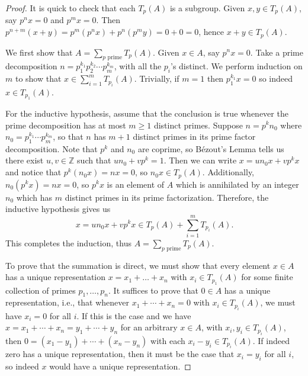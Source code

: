 \documentclass[12pt]{article}
\theoremstyle{definition}
\newcommand{\Z}{\mathbb{Z}}
\newcommand{\<}{\langle}
\renewcommand{\>}{\rangle}
\renewcommand{\_}[1]{{_{#1}}}
\begin{document}
\begin{proof}
    It is quick to check that each $T_p(A)$ is a subgroup.
    Given $x, y \in T_p(A)$, say $p^nx = 0$ and $p^mx = 0$.
    Then $p^{n+m}(x + y) = p^m(p^nx) + p^n(p^my) = 0 + 0 = 0$, hence $x + y \in T_p(A)$.

    We first show that $A = \sum_{p \text{ prime}} T_p(A)$.
    Given $x \in A$, say $p^nx = 0$.
    Take a prime decomposition $n = p_1^{k_1}p_2^{k_2} \cdots p_m^{k_m}$, with all the $p_i$'s distinct.
    We perform induction on $m$ to show that $x \in \sum_{i=1}^{m} T_{p_i}(A)$.
    Trivially, if $m = 1$ then $p_1^{k_1}x = 0$ so indeed $x \in T_{p_1}(A)$.

    For the inductive hypothesis, assume that the conclusion is true whenever the prime decomposition has at most $m \geq 1$ distinct primes.
    Suppose $n = p^kn_0$ where $n_0 = p_1^{k_1} \cdots p_m^{k_m}$, so that $n$ has $m + 1$ distinct primes in its prime factor decomposition.
    Note that $p^k$ and $n_0$ are coprime, so B\'ezout's Lemma tells us there exist $u, v \in \Z$ such that $un_0 + vp^k = 1$.
    Then we can write $x = un_0x + vp^kx$ and notice that $p^k(n_0x) = nx = 0$, so $n_0x \in T_p(A)$.
    Additionally, $n_0(p^kx) = nx = 0$, so $p^kx$ is an element of $A$ which is annihilated by an integer $n_0$ which has $m$ distinct primes in its prime factorization.
    Therefore, the inductive hypothesis gives us
    \[
        x = un_0x + vp^kx \in T_p(A) + \sum_{i=1}^{m} T_{p_i}(A).
    \]
    This completes the induction, thus $A = \sum_{p \text{ prime}} T_p(A)$.

    To prove that the summation is direct, we must show that every element $x \in A$ has a unique representation $x = x_1 + \dots + x_n$ with $x_i \in T_{p_1}(A)$ for some finite collection of primes $p_1, \dots, p_n$.
    It suffices to prove that $0 \in A$ has a unique representation, i.e., that whenever $x_1 + \cdots + x_n = 0$ with $x_i \in T_{p_i}(A)$, we must have $x_i = 0$ for all $i$.
    If this is the case and we have $x = x_1 + \cdots + x_n = y_1 + \cdots + y_n$ for an arbitrary $x \in A$, with $x_i, y_i \in T_{p_i}(A)$, then $0 = (x_1 - y_1) + \cdots + (x_n - y_n)$ with each $x_i - y_i \in T_{p_i}(A)$.
    If indeed zero has a unique representation, then it must be the case that $x_i = y_i$ for all $i$, so indeed $x$ would have a unique representation.


\end{proof}
\end{document}
